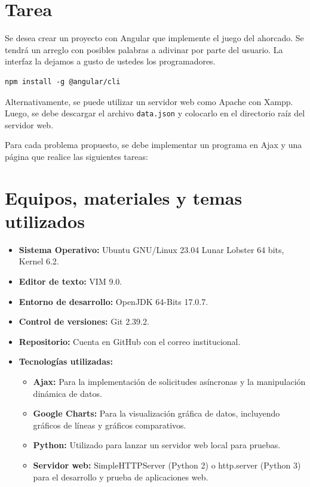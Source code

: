 \documentclass{article}
\begin{document}
	\section{Tarea}
	\begin{itemize}		
Se desea crear un proyecto con Angular que implemente el juego del ahorcado.  Se tendrá un arreglo con posibles palabras a adivinar por parte del usuario.  La interfaz la dejamos a gusto de ustedes los programadores.
\begin{verbatim}
npm install -g @angular/cli    
\end{verbatim}
Alternativamente, se puede utilizar un servidor web como Apache con Xampp. Luego, se debe descargar el archivo \texttt{data.json} y colocarlo en el directorio raíz del servidor web.

Para cada problema propuesto, se debe implementar un programa en Ajax y una página que realice las siguientes tareas:

	\end{itemize}
		
\section{Equipos, materiales y temas utilizados}
\begin{itemize}
    \item \textbf{Sistema Operativo:} Ubuntu GNU/Linux 23.04 Lunar Lobster 64 bits, Kernel 6.2.
    \item \textbf{Editor de texto:} VIM 9.0.
    \item \textbf{Entorno de desarrollo:} OpenJDK 64-Bits 17.0.7.
    \item \textbf{Control de versiones:} Git 2.39.2.
    \item \textbf{Repositorio:} Cuenta en GitHub con el correo institucional.
    \item \textbf{Tecnologías utilizadas:}
    \begin{itemize}
        \item \textbf{Ajax:} Para la implementación de solicitudes asíncronas y la manipulación dinámica de datos.
        \item \textbf{Google Charts:} Para la visualización gráfica de datos, incluyendo gráficos de líneas y gráficos comparativos.
        \item \textbf{Python:} Utilizado para lanzar un servidor web local para pruebas.
        \item \textbf{Servidor web:} SimpleHTTPServer (Python 2) o http.server (Python 3) para el desarrollo y prueba de aplicaciones web.
    \end{itemize}
\end{itemize}
\end{document}
